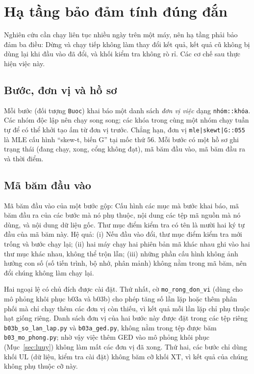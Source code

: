 \documentclass[12pt,a4paper]{article}
\theoremstyle{remark}
\newcommand{\ma}[1]{\texttt{\small #1}}
\newcommand{\UL}{\mathrm{UL}}
\newcommand{\XT}{\mathrm{XT}}
\begin{document}
\section{Hạ tầng bảo đảm tính đúng đắn}\label{sec:hatang}

Nghiên cứu cần chạy liên tục nhiều ngày trên một máy, nên hạ tầng phải bảo đảm ba điều: Dừng và chạy tiếp không làm thay đổi kết quả, kết quả cũ không bị dùng lại khi đầu vào đã đổi, và khối kiểm tra không rò rỉ. Các cơ chế sau thực hiện việc này.

\subsection{Bước, đơn vị và hồ sơ}

Mỗi bước (đối tượng \ma{Buoc}) khai báo một danh sách \emph{đơn vị việc} dạng \ma{nhóm::khóa}. Các nhóm độc lập nên chạy song song; các khóa trong cùng một nhóm chạy tuần tự để có thể khởi tạo ấm từ đơn vị trước. Chẳng hạn, đơn vị \ma{mle|skewt|G::055} là MLE cấu hình ``skew-t, biến G'' tại mốc thứ $56$. Mỗi bước có một hồ sơ ghi trạng thái (đang chạy, xong, cổng không đạt), mã băm đầu vào, mã băm đầu ra và thời điểm.

\subsection{Mã băm đầu vào}

Mã băm đầu vào của một bước gộp: Cấu hình các mục mà bước khai báo, mã băm đầu ra của các bước mà nó phụ thuộc, nội dung các tệp mã nguồn mà nó dùng, và nội dung dữ liệu gốc. Thư mục điểm kiểm tra có tên là mười hai ký tự đầu của mã băm này. Hệ quả: (i) Nếu đầu vào đổi, thư mục điểm kiểm tra mới trống và bước chạy lại; (ii) hai máy chạy hai phiên bản mã khác nhau ghi vào hai thư mục khác nhau, không thể trộn lẫn; (iii) những phần cấu hình không ảnh hưởng con số (số tiến trình, bộ nhớ, phân mảnh) không nằm trong mã băm, nên đổi chúng không làm chạy lại.

Hai ngoại lệ có chủ đích được cài đặt. Thứ nhất, cờ \ma{mo\_rong\_don\_vi} (dùng cho mô phỏng khôi phục b03a và b03b) cho phép tăng số lần lặp hoặc thêm phân phối mà chỉ chạy thêm các đơn vị còn thiếu, vì kết quả mỗi lần lặp chỉ phụ thuộc hạt giống riêng. Danh sách đơn vị của hai bước này được đặt trong các tệp riêng \ma{b03b\_so\_lan\_lap.py} và \ma{b03a\_ged.py}, không nằm trong tệp được băm \ma{b03\_mo\_phong.py}; nhờ vậy việc thêm GED vào mô phỏng khôi phục (Mục~\ref{sec:luuy}) không làm mất các đơn vị đã xong. Thứ hai, các bước chỉ dùng khối $\UL$ (dữ liệu, kiểm tra cài đặt) không băm cỡ khối $\XT$, vì kết quả của chúng không phụ thuộc cỡ này.
\end{document}
